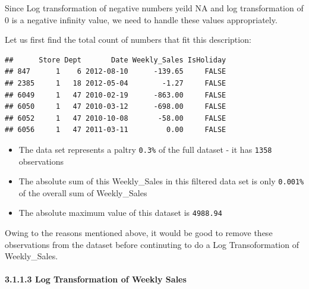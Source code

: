 \documentclass[]{article}
\newenvironment{Shaded}{\begin{snugshade}}{\end{snugshade}}
\newcommand{\KeywordTok}[1]{\textcolor[rgb]{0.13,0.29,0.53}{\textbf{{#1}}}}
\newcommand{\DecValTok}[1]{\textcolor[rgb]{0.00,0.00,0.81}{{#1}}}
\newcommand{\StringTok}[1]{\textcolor[rgb]{0.31,0.60,0.02}{{#1}}}
\newcommand{\NormalTok}[1]{{#1}}
\begin{document}
Since Log transformation of negative numbers yeild NA and log
transformation of 0 is a negative infinity value, we need to handle
these values appropriately.

Let us first find the total count of numbers that fit this description:

\begin{Shaded}
\end{Shaded}

\begin{verbatim}
##      Store Dept       Date Weekly_Sales IsHoliday
## 847      1    6 2012-08-10      -139.65     FALSE
## 2385     1   18 2012-05-04        -1.27     FALSE
## 6049     1   47 2010-02-19      -863.00     FALSE
## 6050     1   47 2010-03-12      -698.00     FALSE
## 6052     1   47 2010-10-08       -58.00     FALSE
## 6056     1   47 2011-03-11         0.00     FALSE
\end{verbatim}

\begin{itemize}
\itemsep1pt\parskip0pt
\item
  The data set represents a paltry \texttt{0.3\%} of the full dataset -
  it has \texttt{1358} observations
\item
  The absolute sum of this Weekly\_Sales in this filtered data set is
  only \texttt{0.001\%} of the overall sum of Weekly\_Sales
\item
  The absolute maximum value of this dataset is \texttt{4988.94}
\end{itemize}

Owing to the reasons mentioned above, it would be good to remove these
observations from the dataset before continuting to do a Log
Transoformation of Weekly\_Sales.

\paragraph{3.1.1.3 Log Transformation of Weekly
Sales}\label{log-transformation-of-weekly-sales}

\begin{Shaded}
\end{Shaded}
\end{document}
